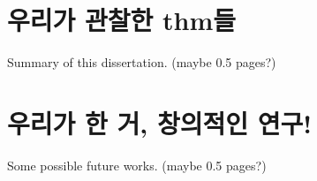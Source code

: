 \section{우리가 관찰한 thm들}
Summary of this dissertation. (maybe 0.5 pages?)

\section{우리가 한 거, 창의적인 연구!}
Some possible future works. (maybe 0.5 pages?)